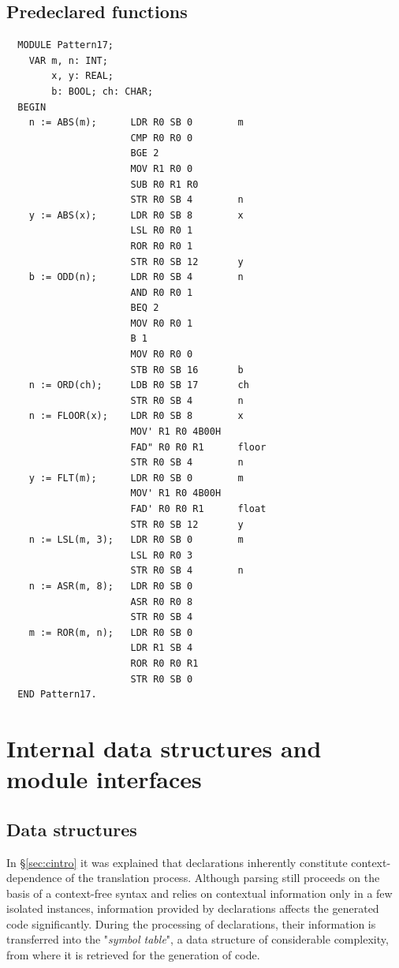 \subsection{Predeclared functions}
\begin{verbatim}
  MODULE Pattern17;
    VAR m, n: INT;
        x, y: REAL;
        b: BOOL; ch: CHAR;
  BEGIN
    n := ABS(m);      LDR R0 SB 0        m      
                      CMP R0 R0 0        
                      BGE 2              
                      MOV R1 R0 0        
                      SUB R0 R1 R0       
                      STR R0 SB 4        n
    y := ABS(x);      LDR R0 SB 8        x
                      LSL R0 R0 1        
                      ROR R0 R0 1        
                      STR R0 SB 12       y
    b := ODD(n);      LDR R0 SB 4        n
                      AND R0 R0 1        
                      BEQ 2              
                      MOV R0 R0 1        
                      B 1                
                      MOV R0 R0 0        
                      STB R0 SB 16       b
    n := ORD(ch);     LDB R0 SB 17       ch
                      STR R0 SB 4        n
    n := FLOOR(x);    LDR R0 SB 8        x
                      MOV' R1 R0 4B00H   
                      FAD" R0 R0 R1      floor
                      STR R0 SB 4        n
    y := FLT(m);      LDR R0 SB 0        m
                      MOV' R1 R0 4B00H   
                      FAD' R0 R0 R1      float
                      STR R0 SB 12       y
    n := LSL(m, 3);   LDR R0 SB 0        m
                      LSL R0 R0 3        
                      STR R0 SB 4        n
    n := ASR(m, 8);   LDR R0 SB 0
                      ASR R0 R0 8
                      STR R0 SB 4
    m := ROR(m, n);   LDR R0 SB 0
                      LDR R1 SB 4
                      ROR R0 R0 R1
                      STR R0 SB 0
  END Pattern17.
\end{verbatim}

\section{Internal data structures and module interfaces}
\subsection{Data structures}
In \S \ref{sec:cintro} it was explained that declarations inherently constitute context-dependence of
the translation process. Although parsing still proceeds on the basis of a context-free syntax and
relies on contextual information only in a few isolated instances, information provided by declarations
affects the generated code significantly. During the processing of declarations, their information is
transferred into the "\emph{symbol table}", a data structure of considerable complexity, from where
it is retrieved for the generation of code.

